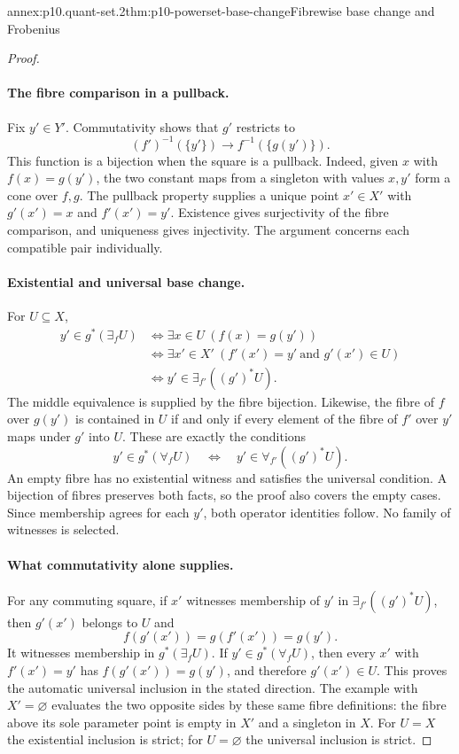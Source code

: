 \begin{annexitem}{annex:p10.quant-set.2}{thm:p10-powerset-base-change}{Fibrewise base change and Frobenius}
\begin{proof}
\paragraph{The fibre comparison in a pullback.}
Fix \(y'\in Y'\).  Commutativity shows that \(g'\) restricts to
\[
 (f')^{-1}(\{y'\})\longrightarrow f^{-1}(\{g(y')\}).
\]
This function is a bijection when the square is a pullback.
Indeed, given \(x\) with \(f(x)=g(y')\), the two constant
maps from a singleton with values \(x,y'\) form a cone
over \(f,g\).  The pullback property supplies a unique point
\(x'\in X'\) with \(g'(x')=x\) and \(f'(x')=y'\).
Existence gives surjectivity of the fibre comparison,
and uniqueness gives injectivity.
The argument concerns each compatible pair individually.

\paragraph{Existential and universal base change.}
For \(U\subseteq X\),
\[
\begin{aligned}
 y'\in g^*(\exists_fU)
 &\Longleftrightarrow
      \exists x\in U\ (f(x)=g(y'))\\
 &\Longleftrightarrow
      \exists x'\in X'\
          (f'(x')=y'\ \text{and }g'(x')\in U)\\
 &\Longleftrightarrow
      y'\in\exists_{f'}((g')^*U).
\end{aligned}
\]
The middle equivalence is supplied by the fibre bijection.
Likewise, the fibre of \(f\) over \(g(y')\) is contained in
\(U\) if and only if every element of the fibre of \(f'\)
over \(y'\) maps under \(g'\) into \(U\).
These are exactly the conditions
\[
             y'\in g^*(\forall_fU)
               \quad\Longleftrightarrow\quad
             y'\in\forall_{f'}((g')^*U).
\]
An empty fibre has no existential witness and satisfies
the universal condition.  A bijection of fibres preserves
both facts, so the proof also covers the empty cases.
Since membership agrees for each \(y'\), both operator
identities follow.  No family of witnesses is selected.

\paragraph{What commutativity alone supplies.}
For any commuting square, if \(x'\) witnesses membership
of \(y'\) in \(\exists_{f'}((g')^*U)\), then \(g'(x')\)
belongs to \(U\) and
\[
                    f(g'(x'))=g(f'(x'))=g(y').
\]
It witnesses membership in \(g^*(\exists_fU)\).
If \(y'\in g^*(\forall_fU)\), then every \(x'\) with
\(f'(x')=y'\) has \(f(g'(x'))=g(y')\), and therefore
\(g'(x')\in U\).  This proves the automatic universal
inclusion in the stated direction.
The example with \(X'=\varnothing\) evaluates the two
opposite sides by these same fibre definitions:
the fibre above its sole parameter point is empty in
\(X'\) and a singleton in \(X\).
For \(U=X\) the existential inclusion is strict; for
\(U=\varnothing\) the universal inclusion is strict.


\end{proof}
\end{annexitem}
